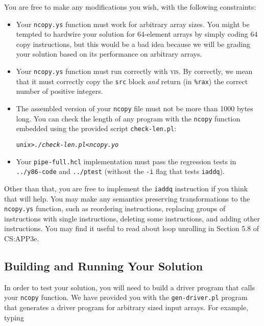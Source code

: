 \documentclass[11pt]{article}
\newenvironment{tty}%
{\small\begin{alltt}}%
{\end{alltt}}
\begin{document}
You are free to make any modifications you wish, with the following
constraints:

\begin{itemize}
\item Your \texttt{ncopy.ys} function must work for arbitrary array
sizes. You might be tempted to hardwire your solution for 64-element
arrays by simply coding 64 copy instructions, but this would be a bad
idea because we will be grading your solution based on its performance
on arbitrary arrays.
\item Your \texttt{ncopy.ys} function must run correctly with \textsc{yis}.
By correctly, we mean that it must correctly copy the \texttt{src} block
{\em and} return (in \texttt{\%rax}) the correct number of positive integers.

\item The assembled version of your \texttt{ncopy} file must not be
more than 1000 bytes long.  You can check the length of any program
with the \texttt{ncopy} function embedded using the provided script
\texttt{check-len.pl}:
\begin{tty}
unix> {\em ./check-len.pl < ncopy.yo}
\end{tty}

\item Your \texttt{pipe-full.hcl} implementation must pass the 
regression tests in \texttt{../y86-code} and \texttt{../ptest}
(without the \texttt{-i} flag that tests {\tt iaddq}).
\end{itemize}

Other than that, you are free to implement the {\tt iaddq} instruction
if you think that will help.
You may make any semantics preserving transformations to the {\tt
ncopy.ys} function, such as reordering instructions, replacing
groups of instructions with single instructions, deleting some
instructions, and adding other instructions.  You may find it useful
to read about loop unrolling in Section 5.8 of CS:APP3e.

\subsection*{Building and Running Your Solution}

In order to test your solution, you will need to build a driver
program that calls your \texttt{ncopy} function.  We have provided you
with the \texttt{gen-driver.pl} program that generates a driver
program for arbitrary sized input arrays. For example, typing
\end{document}
